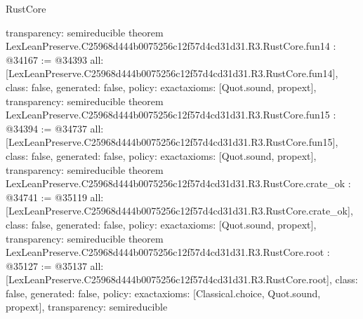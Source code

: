 \begin{lexlean}{RustCore}
\begin{coremodule}
{  transparency: semireducible
}
theorem LexLeanPreserve.C25968d444b0075256c12f57d4cd31d31.R3.RustCore.fun14 : @34167 := @34393 {
  all: [LexLeanPreserve.C25968d444b0075256c12f57d4cd31d31.R3.RustCore.fun14],
  class: false,
  generated: false,
  policy: exact{axioms: [Quot.sound, propext]},
  transparency: semireducible
}
theorem LexLeanPreserve.C25968d444b0075256c12f57d4cd31d31.R3.RustCore.fun15 : @34394 := @34737 {
  all: [LexLeanPreserve.C25968d444b0075256c12f57d4cd31d31.R3.RustCore.fun15],
  class: false,
  generated: false,
  policy: exact{axioms: [Quot.sound, propext]},
  transparency: semireducible
}
theorem LexLeanPreserve.C25968d444b0075256c12f57d4cd31d31.R3.RustCore.crate_ok : @34741 := @35119 {
  all: [LexLeanPreserve.C25968d444b0075256c12f57d4cd31d31.R3.RustCore.crate_ok],
  class: false,
  generated: false,
  policy: exact{axioms: [Quot.sound, propext]},
  transparency: semireducible
}
theorem LexLeanPreserve.C25968d444b0075256c12f57d4cd31d31.R3.RustCore.root : @35127 := @35137 {
  all: [LexLeanPreserve.C25968d444b0075256c12f57d4cd31d31.R3.RustCore.root],
  class: false,
  generated: false,
  policy: exact{axioms: [Classical.choice, Quot.sound, propext]},
  transparency: semireducible
}


\end{coremodule}
\end{lexlean}
